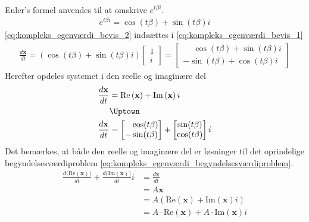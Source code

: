 \begin{bev}
\begin{itemize}
\begin{align}
    \end{align}
    Euler's formel anvendes til at omskrive $e^{t\beta i}$.
    \begin{align} \label{eq:kompleks_egenværdi_bevis_2}
        e^{t\beta i} = \cos(t \beta) + \sin(t \beta) i
    \end{align}
    \eqref{eq:kompleks_egenværdi_bevis_2} indsættes i \eqref{eq:kompleks_egenværdi_bevis_1}
    \begin{align*}
        \frac{d\textbf{x}}{dt}=  \left(\cos(t \beta) + \sin(t \beta )i\right)\begin{bmatrix} 1 \\ i \end{bmatrix} = \begin{bmatrix} \phantom{-}\cos(t \beta) + \sin(t \beta)i \\ - \sin(t \beta) + \cos(t \beta)i \end{bmatrix}
    \end{align*}
    Herefter opdeles systemet i den reelle og imaginære del
    \begin{align*}
        \frac{d\textbf{x}}{dt}&=\text{Re}\left(\textbf{x}\right) +\text{Im}\left(\textbf{x}\right)i \\
        &\Uptown \\
        \frac{d\textbf{x}}{dt} &= \begin{bmatrix} \phantom{-}\cos(t \beta) \\ - \sin(t \beta) \end{bmatrix} + \begin{bmatrix} \sin(t \beta) \\ \cos(t \beta) \end{bmatrix}i
    \end{align*}
    Det bemærkes, at både den reelle og imaginære del er løsninger til det oprindelige begyndelsesværdiproblem \eqref{eq:kompleks_egenværdi_begyndelsesværdiproblem}. 
    \begin{align*}
        \frac{d\big(\text{Re}\left(\textbf{x}\right)\big)}{dt} + \frac{d\big(\text{Im}\left(\textbf{x}\right)\big)}{dt}i &= \frac{d\textbf{x}}{dt} \\
        &= A\textbf{x} \\
        &= A\left(\text{Re}\left(\textbf{x}\right) + \text{Im}\left(\textbf{x}\right)i\right) \\
        &= A\cdot\text{Re}\left(\textbf{x}\right) + A\cdot\text{Im}\left(\textbf{x}\right)i
    \end{align*}

\end{itemize}
\end{bev}
